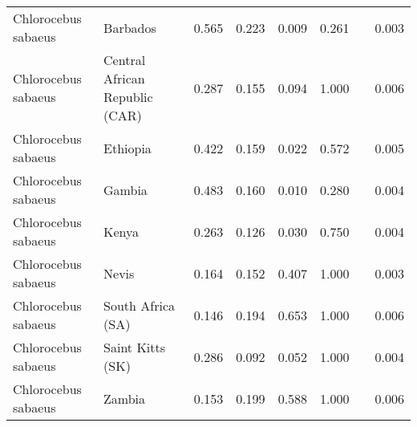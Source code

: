 \begin{center}
\begin{adjustbox}{width = 1\textwidth}
\begin{tabular}{|l|l|r|r|r|r|r|}
 Chlorocebus sabaeus &                        Barbados &                                              0.565 &                                              0.223 &                0.009 &                                  0.261~~ &              0.003 \\
 Chlorocebus sabaeus &  Central African Republic (CAR) &                                              0.287 &                                              0.155 &                0.094 &                                  1.000~~ &              0.006 \\
 Chlorocebus sabaeus &                        Ethiopia &                                              0.422 &                                              0.159 &                0.022 &                                  0.572~~ &              0.005 \\
 Chlorocebus sabaeus &                          Gambia &                                              0.483 &                                              0.160 &                0.010 &                                  0.280~~ &              0.004 \\
 Chlorocebus sabaeus &                           Kenya &                                              0.263 &                                              0.126 &                0.030 &                                  0.750~~ &              0.004 \\
 Chlorocebus sabaeus &                           Nevis &                                              0.164 &                                              0.152 &                0.407 &                                  1.000~~ &              0.003 \\
 Chlorocebus sabaeus &               South Africa (SA) &                                              0.146 &                                              0.194 &                0.653 &                                  1.000~~ &              0.006 \\
 Chlorocebus sabaeus &                Saint Kitts (SK) &                                              0.286 &                                              0.092 &                0.052 &                                  1.000~~ &              0.004 \\
 Chlorocebus sabaeus &                          Zambia &                                              0.153 &                                              0.199 &                0.588 &                                  1.000~~ &              0.006 \\

\end{tabular}
\end{adjustbox}
\end{center}
